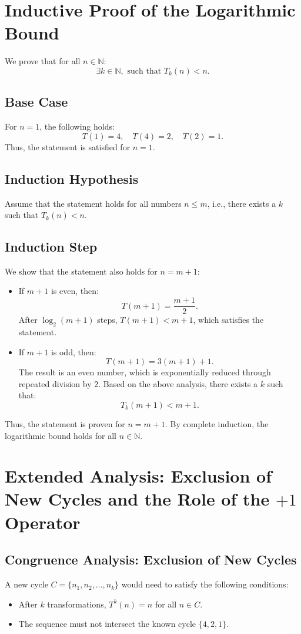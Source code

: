 \documentclass[a4paper,12pt]{article}
\begin{document}
\section{Inductive Proof of the Logarithmic Bound}
We prove that for all \( n \in \mathbb{N} \):
\[
\exists k \in \mathbb{N}, \text{ such that } T_k(n) < n.
\]

\subsection{Base Case}
For \( n = 1 \), the following holds:
\[
T(1) = 4, \quad T(4) = 2, \quad T(2) = 1.
\]
Thus, the statement is satisfied for \( n = 1 \).

\subsection{Induction Hypothesis}
Assume that the statement holds for all numbers \( n \leq m \), i.e., there exists a \( k \) such that \( T_k(n) < n \).

\subsection{Induction Step}
We show that the statement also holds for \( n = m + 1 \):
\begin{itemize}
    \item If \( m + 1 \) is even, then:
    \[
    T(m + 1) = \frac{m + 1}{2}.
    \]
    After \( \log_2(m + 1) \) steps, \( T(m + 1) < m + 1 \), which satisfies the statement.
    \item If \( m + 1 \) is odd, then:
    \[
    T(m + 1) = 3(m + 1) + 1.
    \]
    The result is an even number, which is exponentially reduced through repeated division by 2. Based on the above analysis, there exists a \( k \) such that:
    \[
    T_k(m + 1) < m + 1.
    \]
\end{itemize}

Thus, the statement is proven for \( n = m + 1 \). By complete induction, the logarithmic bound holds for all \( n \in \mathbb{N} \).

\section{Extended Analysis: Exclusion of New Cycles and the Role of the \(+1\) Operator}

\subsection{Congruence Analysis: Exclusion of New Cycles}
A new cycle \( C = \{n_1, n_2, \dots, n_k\} \) would need to satisfy the following conditions:
\begin{itemize}
    \item After \( k \) transformations, \( T^k(n) = n \) for all \( n \in C \).
    \item The sequence must not intersect the known cycle \( \{4, 2, 1\} \).
\end{itemize}
\end{document}
